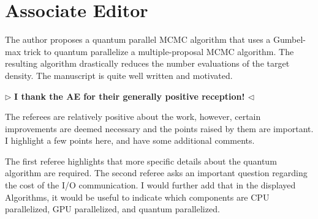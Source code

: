 \documentclass[12pt]{article}
\newenvironment{reply}{$\triangleright$\bfseries}{$\triangleleft$}
\begin{document}
\section*{Associate Editor}



The author proposes a quantum parallel MCMC algorithm that uses a Gumbel-max trick to quantum parallelize a multiple-proposal MCMC algorithm. The resulting algorithm drastically reduces the number evaluations of the target density. The manuscript is quite well written and motivated.

\begin{reply}
	I thank the AE for their generally positive reception!
\end{reply}


The referees are relatively positive about the work, however, certain improvements are deemed necessary and the points raised by them are important. I highlight a few points here, and have some additional comments.


The first referee highlights that more specific details about the quantum algorithm are required. The second referee asks an important question regarding the cost of the I/O communication. I would further add that in the displayed Algorithms, it would be useful to indicate which components are CPU parallelized, GPU parallelized, and quantum parallelized.
\end{document}
